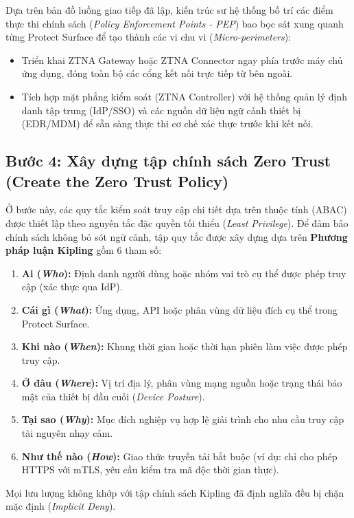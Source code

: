 Dựa trên bản đồ luồng giao tiếp đã lập, kiến trúc sư hệ thống bố trí các điểm thực thi chính sách (\textit{Policy Enforcement Points - PEP}) bao bọc sát xung quanh từng Protect Surface để tạo thành các vi chu vi (\textit{Micro-perimeters}):
\begin{itemize}
    \item Triển khai ZTNA Gateway hoặc ZTNA Connector ngay phía trước máy chủ ứng dụng, đóng toàn bộ các cổng kết nối trực tiếp từ bên ngoài.
    \item Tích hợp mặt phẳng kiểm soát (ZTNA Controller) với hệ thống quản lý định danh tập trung (IdP/SSO) và các nguồn dữ liệu ngữ cảnh thiết bị (EDR/MDM) để sẵn sàng thực thi cơ chế xác thực trước khi kết nối.
\end{itemize}

\subsection{Bước 4: Xây dựng tập chính sách Zero Trust (Create the Zero Trust Policy)}
\label{subsec:5_3_4}

Ở bước này, các quy tắc kiểm soát truy cập chi tiết dựa trên thuộc tính (ABAC) được thiết lập theo nguyên tắc đặc quyền tối thiểu (\textit{Least Privilege}). Để đảm bảo chính sách không bỏ sót ngữ cảnh, tập quy tắc được xây dựng dựa trên \textbf{Phương pháp luận Kipling} gồm 6 tham số:
\begin{enumerate}
    \item \textbf{Ai (\textit{Who}):} Định danh người dùng hoặc nhóm vai trò cụ thể được phép truy cập (xác thực qua IdP).
    \item \textbf{Cái gì (\textit{What}):} Ứng dụng, API hoặc phân vùng dữ liệu đích cụ thể trong Protect Surface.
    \item \textbf{Khi nào (\textit{When}):} Khung thời gian hoặc thời hạn phiên làm việc được phép truy cập.
    \item \textbf{Ở đâu (\textit{Where}):} Vị trí địa lý, phân vùng mạng nguồn hoặc trạng thái bảo mật của thiết bị đầu cuối (\textit{Device Posture}).
    \item \textbf{Tại sao (\textit{Why}):} Mục đích nghiệp vụ hợp lệ giải trình cho nhu cầu truy cập tài nguyên nhạy cảm.
    \item \textbf{Như thế nào (\textit{How}):} Giao thức truyền tải bắt buộc (ví dụ: chỉ cho phép HTTPS với mTLS, yêu cầu kiểm tra mã độc thời gian thực).
\end{enumerate}
Mọi lưu lượng không khớp với tập chính sách Kipling đã định nghĩa đều bị chặn mặc định (\textit{Implicit Deny}).

